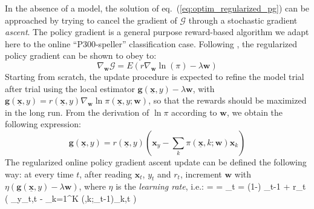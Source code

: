\documentclass[conference]{IEEEtran}
\makeatletter
\newenvironment{equationsize}[1]{%
  \skip@=\baselineskip
  #1%
  \baselineskip=\skip@
  \equation
}{\endequation \ignorespacesafterend}
\makeatother
\begin{document}
In the absence of a model, the solution of eq.~(\ref{eq:optim_regularized_pg}) can be approached 
by trying to cancel the gradient of $\mathcal{G}$
through a stochastic gradient \emph{ascent}.
The policy gradient is a general purpose reward-based algorithm we adapt here to the online 
``P300-speller'' classification case. 
Following \cite{Wil92}, the regularized policy gradient can be shown to obey to: 
\begin{equation}\label{eq:regularized_pg}
\nabla_{\boldsymbol{w}} \mathcal{G} = E(r \nabla_{\boldsymbol{w}} \ln(\pi) - \lambda  \boldsymbol{w}) 
\end{equation} 
Starting from scratch, the update procedure is expected to refine the model trial after trial 
using the local estimator $\boldsymbol{g}(\underline{\mathbf{x}}, y) - \lambda \boldsymbol{w}$,
with
$\boldsymbol{g}(\underline{\mathbf{x}}, y) =  r(\underline{\mathbf{x}},y)\nabla_{\boldsymbol{w}}\ln \pi(\underline{\mathbf{x}},y;\boldsymbol{w})$, 
so that the rewards should be maximized in the long run. 
From the derivation of $\ln \pi$ according to $\boldsymbol{w}$, we obtain the following expression:
\begin{equation}\label{eq:pol_grad_multi}
 \boldsymbol{g}(\underline{\mathbf{x}}, y) 
= r(\underline{\mathbf{x}},y) \left(\boldsymbol{x}_y - \sum_k  \pi(\underline{\mathbf{x}},k;\boldsymbol{w})\boldsymbol{x}_k\right)
\end{equation}
The regularized online policy gradient ascent update  
can be defined the following way:
at every time $t$, after reading $\boldsymbol{x}_t$, $y_t$ and $r_t$, increment $\boldsymbol{w}$ 
with $\eta\left(\boldsymbol{g}(\underline{\mathbf{x}}, y) - \lambda \boldsymbol{w}\right)$, where $\eta$ is the \emph{learning rate}, i.e.:
\begin{equationsize}{\small}\label{eq:online_update}
_t = (1-\eta\lambda) _{t-1} + \eta r_t \left( _{y_t,t} 
- \sum_{k=1}^K  \pi(\underline{},k;_{t-1})_{k,t} \right) 
\end{equationsize}
\end{document}
